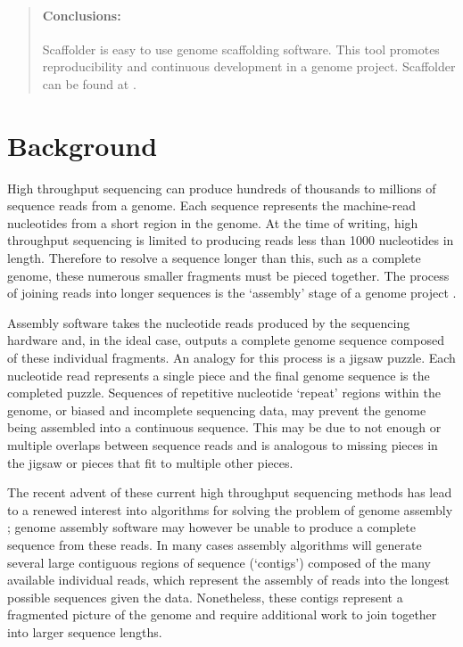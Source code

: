 \documentclass[10pt]{bmc_article}
\newenvironment{bmcformat}{\begin{raggedright}\baselineskip20pt\sloppy\setboolean{publ}{false}}{\end{raggedright}\baselineskip20pt\sloppy}
\begin{document}
\begin{bmcformat}
\begin{abstract}
  \paragraph*{Conclusions:} Scaffolder is easy to use genome scaffolding
  software. This tool promotes reproducibility and continuous development in a
  genome project. Scaffolder can be found at \scaffolder.

\end{abstract}


\clearpage

\section*{Background} %

High throughput sequencing can produce hundreds of thousands to millions of
sequence reads from a genome. Each sequence represents the machine-read
nucleotides from a short region in the genome. At the time of writing, high
throughput sequencing is limited to producing reads less than 1000 nucleotides
in length. Therefore to resolve a sequence longer than this, such as a complete
genome, these numerous smaller fragments must be pieced together. The process
of joining reads into longer sequences is the `assembly' stage of a genome
project \cite{miller2010}. \pb

Assembly software takes the nucleotide reads produced by the sequencing
hardware and, in the ideal case, outputs a complete genome sequence composed of
these individual fragments. An analogy for this process is a jigsaw puzzle.
Each nucleotide read represents a single piece and the final genome sequence is
the completed puzzle. Sequences of repetitive nucleotide `repeat' regions
within the genome, or biased and incomplete sequencing data, may prevent the
genome being assembled into a continuous sequence. This may be due to not
enough or multiple overlaps between sequence reads and is analogous to missing
pieces in the jigsaw or pieces that fit to multiple other pieces. \pb

The recent advent of these current high throughput sequencing methods has lead
to a renewed interest into algorithms for solving the problem of genome
assembly \cite{pop2008,pop2009}; genome assembly software may however be unable
to produce a complete sequence from these reads. In many cases assembly
algorithms will generate several large contiguous regions of sequence
(`contigs') composed of the many available individual reads, which represent the
assembly of reads into the longest possible sequences given the data.
Nonetheless, these contigs represent a fragmented picture of the genome and
require additional work to join together into larger sequence lengths. \pb


\end{bmcformat}
\end{document}
